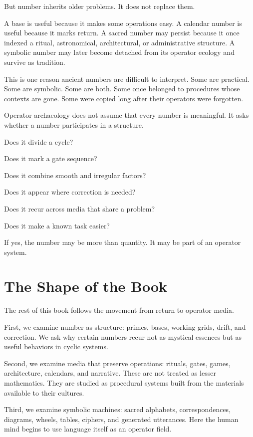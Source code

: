 \documentclass[11pt]{book}
\begin{document}
But number inherits older problems. It does not replace them.

A base is useful because it makes some operations easy. A calendar number is useful because it marks return. A sacred number may persist because it once indexed a ritual, astronomical, architectural, or administrative structure. A symbolic number may later become detached from its operator ecology and survive as tradition.

This is one reason ancient numbers are difficult to interpret. Some are practical. Some are symbolic. Some are both. Some once belonged to procedures whose contexts are gone. Some were copied long after their operators were forgotten.

Operator archaeology does not assume that every number is meaningful. It asks whether a number participates in a structure.

Does it divide a cycle?

Does it mark a gate sequence?

Does it combine smooth and irregular factors?

Does it appear where correction is needed?

Does it recur across media that share a problem?

Does it make a known task easier?

If yes, the number may be more than quantity. It may be part of an operator system.

\section{The Shape of the Book}

The rest of this book follows the movement from return to operator media.

First, we examine number as structure: primes, bases, working grids, drift, and correction. We ask why certain numbers recur not as mystical essences but as useful behaviors in cyclic systems.

Second, we examine media that preserve operations: rituals, gates, games, architecture, calendars, and narrative. These are not treated as lesser mathematics. They are studied as procedural systems built from the materials available to their cultures.

Third, we examine symbolic machines: sacred alphabets, correspondences, diagrams, wheels, tables, ciphers, and generated utterances. Here the human mind begins to use language itself as an operator field.
\end{document}
